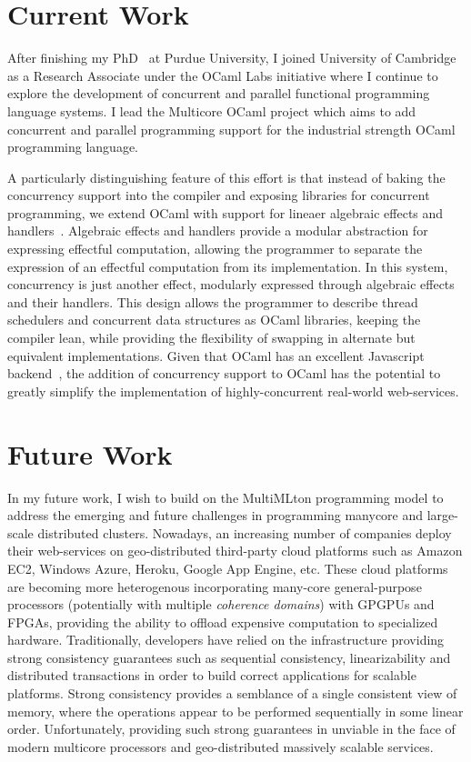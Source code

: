 \documentclass{article}
\begin{document}
\section*{Current Work}

After finishing my PhD~\cite{thesis} at Purdue University, I joined University
of Cambridge as a Research Associate under the OCaml Labs initiative where I
continue to explore the development of concurrent and parallel functional
programming language systems. I lead the Multicore OCaml project which aims to
add concurrent and parallel programming support for the industrial strength
OCaml programming language.

A particularly distinguishing feature of this effort is that instead of baking
the concurrency support into the compiler and exposing libraries for concurrent
programming, we extend OCaml with support for lineaer algebraic effects and
handlers~\cite{effects}. Algebraic effects and handlers provide a modular
abstraction for expressing effectful computation, allowing the programmer to
separate the expression of an effectful computation from its implementation. In
this system, concurrency is just another effect, modularly expressed through
algebraic effects and their handlers. This design allows the programmer to
describe thread schedulers and concurrent data structures as OCaml libraries,
keeping the compiler lean, while providing the flexibility of swapping in
alternate but equivalent implementations. Given that OCaml has an excellent
Javascript backend~\cite{js_of_ocaml}, the addition of concurrency support to
OCaml has the potential to greatly simplify the implementation of
highly-concurrent real-world web-services.

\section*{Future Work}

In my future work, I wish to build on the MultiMLton programming model to
address the emerging and future challenges in programming manycore and
large-scale distributed clusters. Nowadays, an increasing number of companies
deploy their web-services on geo-distributed third-party cloud platforms such
as Amazon EC2, Windows Azure, Heroku, Google App Engine, etc. These cloud
platforms are becoming more heterogenous incorporating many-core
general-purpose processors (potentially with multiple \emph{coherence domains})
with GPGPUs and FPGAs, providing the ability to offload expensive computation
to specialized hardware. Traditionally, developers have relied on the
infrastructure providing strong consistency guarantees such as sequential
consistency, linearizability and distributed transactions in order to build
correct applications for scalable platforms. Strong consistency provides a
semblance of a single consistent view of memory, where the operations appear to
be performed sequentially in some linear order. Unfortunately, providing such
strong guarantees in unviable in the face of modern multicore processors and
geo-distributed massively scalable services.
\end{document}
